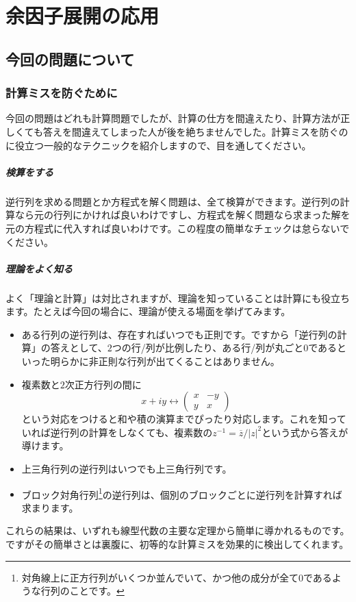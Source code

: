 \chapter{余因子展開の応用}

\section{今回の問題について}

\subsection{計算ミスを防ぐために}

今回の問題はどれも計算問題でしたが、計算の仕方を間違えたり、計算方法が正しくても答えを間違えてしまった人が後を絶ちませんでした。計算ミスを防ぐのに役立つ一般的なテクニックを紹介しますので、目を通してください。

\paragraph{検算をする}

逆行列を求める問題とか方程式を解く問題は、全て検算ができます。逆行列の計算なら元の行列にかければ良いわけですし、方程式を解く問題なら求まった解を元の方程式に代入すれば良いわけです。この程度の簡単なチェックは怠らないでください。

\paragraph{理論をよく知る}

よく「理論と計算」は対比されますが、理論を知っていることは計算にも役立ちます。たとえば今回の場合に、理論が使える場面を挙げてみます。
\begin{itemize}
\item ある行列の逆行列は、存在すればいつでも正則です。ですから「逆行列の計算」の答えとして、$2$つの行/列が比例したり、ある行/列が丸ごと$0$であるといった明らかに非正則な行列が出てくることはありません。
\item 複素数と$2$次正方行列の間に
\[
x + iy \longleftrightarrow
\begin{pmatrix}
x & -y \\
y & x
\end{pmatrix}
\]
という対応をつけると和や積の演算までぴったり対応します。これを知っていれば逆行列の計算をしなくても、複素数の$z^{-1} = \overline{z}/|z|^2$という式から答えが導けます。
\item 上三角行列の逆行列はいつでも上三角行列です。
\item ブロック対角行列\footnote{対角線上に正方行列がいくつか並んでいて、かつ他の成分が全て$0$であるような行列のことです。}の逆行列は、個別のブロックごとに逆行列を計算すれば求まります。
\end{itemize}
これらの結果は、いずれも線型代数の主要な定理から簡単に導かれるものです。ですがその簡単さとは裏腹に、初等的な計算ミスを効果的に検出してくれます。

